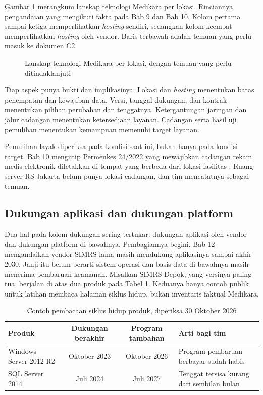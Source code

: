 Gambar \ref{fig:ch07-lanskap-teknologi} merangkum lanskap teknologi Medikara per lokasi. Rinciannya pengandaian yang mengikuti
fakta pada Bab 9 dan Bab 10. Kolom pertama sampai ketiga memperlihatkan \textit{hosting} sendiri, sedangkan kolom keempat
memperlihatkan \textit{hosting} oleh vendor. Baris terbawah adalah temuan yang perlu masuk ke dokumen C2.

\begin{figure}[!htb]
  \centering
  
  \caption{Lanskap teknologi Medikara per lokasi, dengan temuan yang perlu ditindaklanjuti}
  \label{fig:ch07-lanskap-teknologi}
\end{figure}

Tiap aspek punya bukti dan implikasinya. Lokasi dan \textit{hosting} menentukan batas penempatan dan kewajiban data.
Versi, tanggal dukungan, dan kontrak menentukan pilihan perubahan dan tenggatnya. Ketergantungan jaringan dan jalur
cadangan menentukan ketersediaan layanan. Cadangan serta hasil uji pemulihan menentukan kemampuan memenuhi target
layanan.

Pemulihan layak diperiksa pada kondisi saat ini, bukan hanya pada kondisi target. Bab 10 mengutip Permenkes 24/2022 yang mewajibkan
cadangan rekam medis elektronik diletakkan di tempat yang berbeda dari lokasi fasilitas \cite{permenkes24-2022}. Ruang server RS Jakarta
belum punya lokasi cadangan, dan tim mencatatnya sebagai temuan.

\subsection*{Dukungan aplikasi dan dukungan platform}

Dua hal pada kolom dukungan sering tertukar: dukungan aplikasi oleh vendor dan dukungan platform di bawahnya. Pembagiannya begini.
Bab 12 mengandaikan vendor SIMRS lama masih mendukung aplikasinya sampai akhir 2030. Janji itu belum berarti sistem operasi dan basis
data di bawahnya masih menerima pembaruan keamanan. Misalkan SIMRS Depok, yang versinya paling tua, berjalan di atas dua produk pada Tabel
\ref{tab:ch07-siklus-hidup}. Keduanya hanya contoh publik untuk latihan membaca halaman siklus hidup, bukan inventaris faktual Medikara.

\begin{table}[!htb]
  \centering
  \caption{Contoh pembacaan siklus hidup produk, diperiksa 30 Oktober 2026}
  \label{tab:ch07-siklus-hidup}
  \small
  \begin{tabularx}{\textwidth}{>{\raggedright\arraybackslash}Xcc>{\raggedright\arraybackslash}p{3.8cm}}
    \hline
    \textbf{Produk} & \textbf{Dukungan berakhir} & \textbf{Program tambahan} & \textbf{Arti bagi tim} \\
    \hline
    Windows Server 2012 R2 \cite{c07-ms-ws2012r2} & Oktober 2023 & Oktober 2026 & Program pembaruan berbayar sudah habis \\
    \hline
    SQL Server 2014 \cite{c07-ms-sql2014} & Juli 2024 & Juli 2027 & Tenggat tersisa kurang dari sembilan bulan \\
    \hline
  \end{tabularx}
\end{table}

